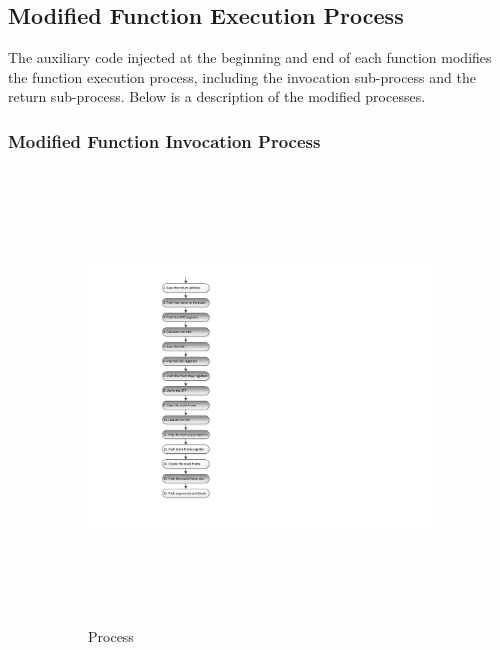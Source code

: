 \subsection{Modified Function Execution Process}
\vspace{-10pt}
The auxiliary code injected at the beginning and end of each function modifies the function execution process, including the invocation sub-process and the return sub-process. Below is a description of the modified processes.
\vspace{-15pt}
\subsubsection{Modified Function Invocation Process}
\begin{figure}[h]
	\centering
	\begin{subfigure}[b]{0.4\columnwidth}
		\includegraphics[width=\textwidth, height=12cm]{figures/modified_function_operations_process_pre_execution_v2}
		\caption{Process}
		\label{fig:modified_function_operation_process_pre_execution}
	\end{subfigure}~
	\begin{subfigure}[b]{0.6\columnwidth}

\end{subfigure}
\end{figure}
